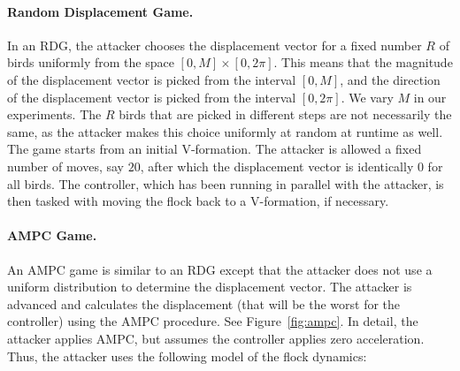 \vspace*{-0.5mm}\paragraph{\bf Random Displacement Game.}
In an RDG, the attacker chooses the displacement vector for a fixed number $R$ of birds uniformly from the space $[0,M]\times[0,2\pi]$. This means that the magnitude of the displacement vector is picked from the interval $[0,M]$, and the direction of the displacement vector is picked from the interval $[0,2\pi]$. We vary $M$ in our experiments. The $R$ birds that are picked in different steps are not necessarily the same, as the attacker makes this choice uniformly at random at runtime as well.
The game starts from an initial V-formation. The attacker is allowed a fixed number of moves, say $20$, after which the displacement vector is identically $0$ for all birds.  The controller, which has been running in parallel with the attacker, is then tasked with moving the flock back to a V-formation, if necessary.
%
\vspace*{-0.5mm}\paragraph{\bf{AMPC Game.}}
An AMPC game is similar to an RDG except that the attacker does not use a uniform distribution to determine the displacement vector. The attacker is advanced and calculates the displacement (that will be the worst for the controller) using the AMPC procedure. See Figure~\ref{fig:ampc}.  In detail, the attacker applies AMPC, but assumes the controller applies zero acceleration. Thus, the attacker uses the following model of the flock dynamics:
